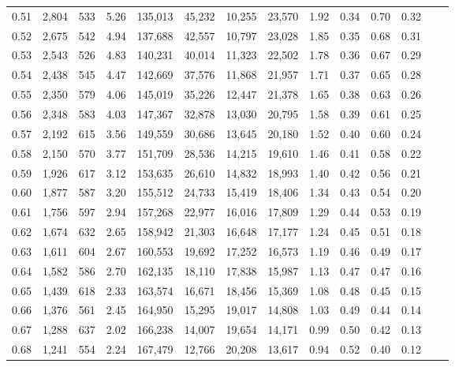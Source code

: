 \begin{tabular}{rrrrrrrrrrrrrr}
0.51 &  2,804 &  533 &    5.26 &  135,013 &   45,232 &  10,255 &  23,570 &  1.92 &  0.34 &  0.70 &      0.32 \\
0.52 &  2,675 &  542 &    4.94 &  137,688 &   42,557 &  10,797 &  23,028 &  1.85 &  0.35 &  0.68 &      0.31 \\
0.53 &  2,543 &  526 &    4.83 &  140,231 &   40,014 &  11,323 &  22,502 &  1.78 &  0.36 &  0.67 &      0.29 \\
0.54 &  2,438 &  545 &    4.47 &  142,669 &   37,576 &  11,868 &  21,957 &  1.71 &  0.37 &  0.65 &      0.28 \\
0.55 &  2,350 &  579 &    4.06 &  145,019 &   35,226 &  12,447 &  21,378 &  1.65 &  0.38 &  0.63 &      0.26 \\
0.56 &  2,348 &  583 &    4.03 &  147,367 &   32,878 &  13,030 &  20,795 &  1.58 &  0.39 &  0.61 &      0.25 \\
0.57 &  2,192 &  615 &    3.56 &  149,559 &   30,686 &  13,645 &  20,180 &  1.52 &  0.40 &  0.60 &      0.24 \\
0.58 &  2,150 &  570 &    3.77 &  151,709 &   28,536 &  14,215 &  19,610 &  1.46 &  0.41 &  0.58 &      0.22 \\
0.59 &  1,926 &  617 &    3.12 &  153,635 &   26,610 &  14,832 &  18,993 &  1.40 &  0.42 &  0.56 &      0.21 \\
0.60 &  1,877 &  587 &    3.20 &  155,512 &   24,733 &  15,419 &  18,406 &  1.34 &  0.43 &  0.54 &      0.20 \\
0.61 &  1,756 &  597 &    2.94 &  157,268 &   22,977 &  16,016 &  17,809 &  1.29 &  0.44 &  0.53 &      0.19 \\
0.62 &  1,674 &  632 &    2.65 &  158,942 &   21,303 &  16,648 &  17,177 &  1.24 &  0.45 &  0.51 &      0.18 \\
0.63 &  1,611 &  604 &    2.67 &  160,553 &   19,692 &  17,252 &  16,573 &  1.19 &  0.46 &  0.49 &      0.17 \\
0.64 &  1,582 &  586 &    2.70 &  162,135 &   18,110 &  17,838 &  15,987 &  1.13 &  0.47 &  0.47 &      0.16 \\
0.65 &  1,439 &  618 &    2.33 &  163,574 &   16,671 &  18,456 &  15,369 &  1.08 &  0.48 &  0.45 &      0.15 \\
0.66 &  1,376 &  561 &    2.45 &  164,950 &   15,295 &  19,017 &  14,808 &  1.03 &  0.49 &  0.44 &      0.14 \\
0.67 &  1,288 &  637 &    2.02 &  166,238 &   14,007 &  19,654 &  14,171 &  0.99 &  0.50 &  0.42 &      0.13 \\
0.68 &  1,241 &  554 &    2.24 &  167,479 &   12,766 &  20,208 &  13,617 &  0.94 &  0.52 &  0.40 &      0.12 \\

\end{tabular}
